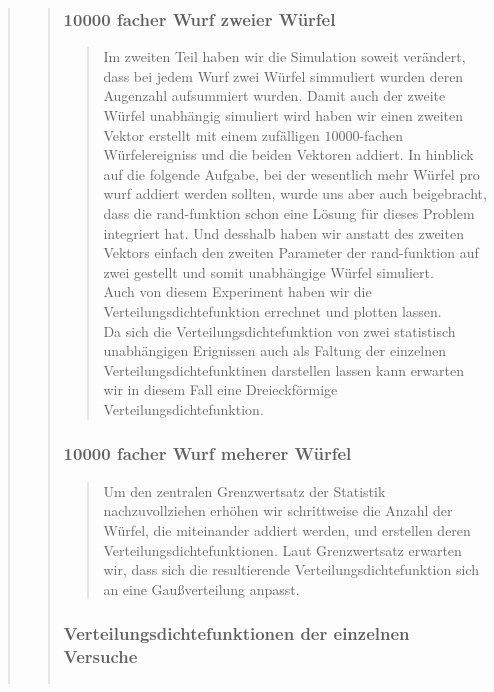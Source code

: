\begin{quote}
\begin{quote}
        \subsubsection{10000 facher Wurf zweier Würfel}
		\begin{quote}
			Im zweiten Teil haben wir die Simulation soweit verändert, dass bei jedem Wurf zwei Würfel simmuliert wurden deren
			Augenzahl aufsummiert wurden. Damit auch der zweite Würfel unabhängig simuliert wird haben wir einen zweiten Vektor
			erstellt mit einem zufälligen $10000$-fachen Würfelereigniss und die beiden Vektoren addiert. In hinblick auf die
			folgende Aufgabe, bei der wesentlich mehr Würfel pro wurf addiert werden sollten, wurde uns aber auch beigebracht,
			dass die rand-funktion schon eine Lösung für dieses Problem integriert hat. Und desshalb haben wir anstatt des
			zweiten Vektors einfach den zweiten Parameter der rand-funktion auf zwei gestellt und somit unabhängige Würfel
			simuliert.\\
			Auch von diesem Experiment haben wir die Verteilungsdichtefunktion errechnet und plotten lassen.\\
			Da sich die Verteilungsdichtefunktion von zwei statistisch unabhängigen Erignissen auch als Faltung der einzelnen
			Verteilungsdichtefunktinen darstellen lassen kann erwarten wir in diesem Fall eine Dreieckförmige
			Verteilungsdichtefunktion.
		\end{quote}
        
        \subsubsection{10000 facher Wurf meherer Würfel}
		\begin{quote}
			Um den zentralen Grenzwertsatz der Statistik nachzuvollziehen erhöhen wir schrittweise die Anzahl der Würfel, die
			miteinander addiert werden, und erstellen deren Verteilungsdichtefunktionen. Laut Grenzwertsatz erwarten wir, dass
			sich die resultierende Verteilungsdichtefunktion sich an eine Gaußverteilung anpasst.
		\end{quote}
		
		\subsubsection{Verteilungsdichtefunktionen der einzelnen Versuche}
		\begin{quote}    
            \begin{center}
            \begin{tabular}{ll}


\end{tabular}
\end{center}
\end{quote}
\end{quote}
\end{quote}
